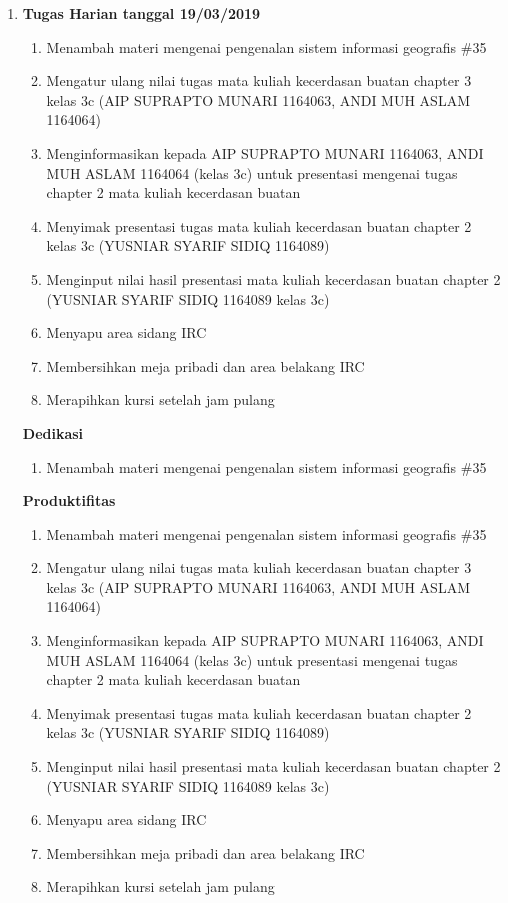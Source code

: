 \begin{enumerate}
\item \textbf{Tugas Harian tanggal 19/03/2019}
\begin{enumerate}
\item Menambah materi mengenai pengenalan sistem informasi geografis \#35
\item Mengatur ulang nilai tugas mata kuliah kecerdasan buatan chapter 3 kelas 3c (AIP SUPRAPTO MUNARI 1164063, ANDI MUH ASLAM 1164064)
\item Menginformasikan kepada AIP SUPRAPTO MUNARI 1164063, ANDI MUH ASLAM 1164064 (kelas 3c) untuk presentasi mengenai  tugas chapter 2 mata kuliah kecerdasan buatan
\item Menyimak presentasi tugas mata kuliah kecerdasan buatan chapter 2 kelas 3c (YUSNIAR SYARIF SIDIQ 1164089)
\item Menginput nilai hasil presentasi mata kuliah kecerdasan buatan chapter 2 (YUSNIAR SYARIF SIDIQ 1164089 kelas 3c)
\item Menyapu area sidang IRC
\item Membersihkan meja pribadi dan area belakang IRC
\item Merapihkan kursi setelah jam pulang 
\end{enumerate}

\textbf{Dedikasi}
\begin{enumerate}
\item Menambah materi mengenai pengenalan sistem informasi geografis \#35
\end{enumerate}

\textbf{Produktifitas}
\begin{enumerate}
\item Menambah materi mengenai pengenalan sistem informasi geografis \#35
\item Mengatur ulang nilai tugas mata kuliah kecerdasan buatan chapter 3 kelas 3c (AIP SUPRAPTO MUNARI 1164063, ANDI MUH ASLAM 1164064)
\item Menginformasikan kepada AIP SUPRAPTO MUNARI 1164063, ANDI MUH ASLAM 1164064 (kelas 3c) untuk presentasi mengenai  tugas chapter 2 mata kuliah kecerdasan buatan
\item Menyimak presentasi tugas mata kuliah kecerdasan buatan chapter 2 kelas 3c (YUSNIAR SYARIF SIDIQ 1164089)
\item Menginput nilai hasil presentasi mata kuliah kecerdasan buatan chapter 2 (YUSNIAR SYARIF SIDIQ 1164089 kelas 3c)
\item Menyapu area sidang IRC
\item Membersihkan meja pribadi dan area belakang IRC
\item Merapihkan kursi setelah jam pulang 
\end{enumerate}


\end{enumerate}
